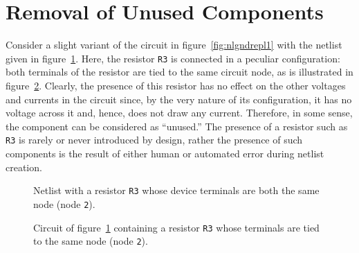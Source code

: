 
\section{Removal of Unused Components}
\label{PP_removeunused}

Consider a slight variant of the circuit in figure\ \ref{fig:nlgndrepl1} with
the netlist given in figure\ \ref{fig:nlunused1}.  Here, the resistor \texttt{R3}
is connected in a peculiar configuration:  both terminals of the resistor are 
tied to the same circuit node, as is illustrated in figure\ \ref{fig:unused1}.
Clearly, the presence of this resistor has no effect on the other voltages and
currents in the circuit since, by the very nature of its configuration, it has
no voltage across it and, hence, does not draw any current.  Therefore, in 
some sense, the component can be considered as ``unused.''  The presence of a resistor such as \texttt{R3} is rarely or never introduced by design, rather the presence of such components is the 
result of either human or automated error during netlist creation.

\begin{figure}[htbp]
\begin{centering}
\caption[Netlist with a resistor with terminals both the
same node.] {Netlist with a resistor \texttt{R3} whose device terminals are both the
same node (node \texttt{2}).}
\label{fig:nlunused1}
\end{centering}
\end{figure}

\begin{figure}
\centering{}
\caption[Circuit of figure\ \ref{fig:nlunused1}.] {Circuit of figure\ \ref{fig:nlunused1} containing a resistor \texttt{R3} whose terminals are tied to the same node (node \texttt{2}).} 
\label{fig:unused1}
\end{figure}

